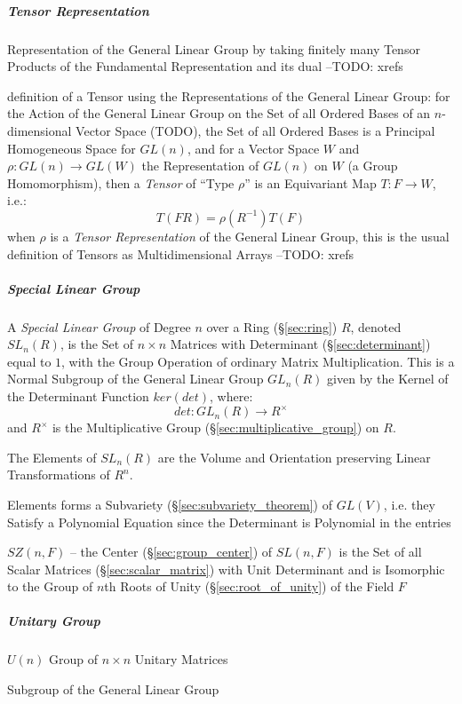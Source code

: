 \subparagraph{Tensor Representation}\label{sec:tensor_representation}\hfill

Representation of the General Linear Group by taking finitely many Tensor
Products of the Fundamental Representation and its dual
--TODO: xrefs

definition of a Tensor using the Representations of the General Linear Group:
for the Action of the General Linear Group on the Set of all Ordered Bases of an
$n$-dimensional Vector Space (TODO), the Set of all Ordered Bases is a Principal
Homogeneous Space for $GL(n)$, and for a Vector Space $W$ and
$\rho : GL(n) \to GL(W)$ the Representation of $GL(n)$ on $W$ (a Group
Homomorphism), then a \emph{Tensor} of ``Type $\rho$'' is an Equivariant Map
$T : F \to W$, i.e.:
\[
  T(FR) = \rho(R^{-1})T(F)
\]
when $\rho$ is a \emph{Tensor Representation} of the General Linear Group, this
is the usual definition of Tensors as Multidimensional Arrays
--TODO: xrefs



\subparagraph{Special Linear Group}\label{sec:special_linear_group}\hfill

A \emph{Special Linear Group} of Degree $n$ over a Ring (\S\ref{sec:ring}) $R$,
denoted $SL_n(R)$, is the Set of $n \times n$ Matrices with Determinant
(\S\ref{sec:determinant}) equal to $1$, with the Group Operation of ordinary
Matrix Multiplication. This is a Normal Subgroup of the General Linear Group
$GL_n(R)$ given by the Kernel of the Determinant Function $ker(det)$, where:
\[
  det : GL_n(R) \rightarrow R^\times
\]
and $R^\times$ is the Multiplicative Group
(\S\ref{sec:multiplicative_group}) on $R$.

The Elements of $SL_n(R)$ are the Volume and Orientation preserving
Linear Transformations of $R^n$.

Elements forms a Subvariety (\S\ref{sec:subvariety_theorem}) of $GL(V)$, i.e.
they Satisfy a Polynomial Equation since the Determinant is Polynomial in the
entries

$SZ(n,F)$ -- the Center (\S\ref{sec:group_center}) of $SL(n,F)$ is the Set of
all Scalar Matrices (\S\ref{sec:scalar_matrix}) with Unit Determinant and is
Isomorphic to the Group of $n$th Roots of Unity (\S\ref{sec:root_of_unity})
of the Field $F$



\subparagraph{Unitary Group}\label{sec:unitary_group}\hfill

$U(n)$ Group of $n \times n$ Unitary Matrices

Subgroup of the General Linear Group

